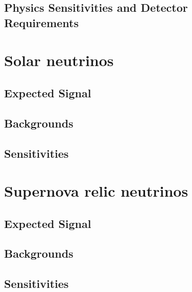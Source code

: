 \subsection{Physics Sensitivities and Detector Requirements}



\section{Solar neutrinos}
\label{sec:snb-lowe-solar}



\subsection{Expected Signal}

\subsection{Backgrounds}

\subsection{Sensitivities}

\section{Supernova relic neutrinos}
\label{sec:snb-lowe-relic}

\subsection{Expected Signal}

\subsection{Backgrounds}

\subsection{Sensitivities}



